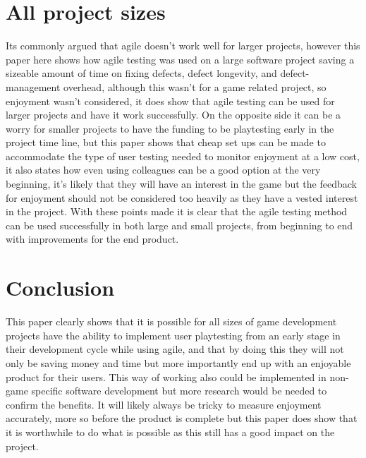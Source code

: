 \documentclass{scrartcl}
\begin{document}
\section{All project sizes}
Its commonly argued that agile doesn't work well for larger projects, however this paper here\cite{talby2006agile} shows how agile testing was used on a large software project saving a sizeable amount of time on fixing defects, defect longevity, and defect-management overhead, although this wasn't for a game related project, so enjoyment wasn't considered, it does show that agile testing can be used for larger projects and have it work successfully. On the opposite side it can be a worry for smaller projects to have the funding to be playtesting early in the project time line, but this paper\cite{moosajee2016games} shows that cheap set ups can be made to accommodate the type of user testing needed to monitor enjoyment at a low cost, it also states how even using colleagues can be a good option at the very beginning, it's likely that they will have an interest in the game but the feedback for enjoyment should not be considered too heavily as they have a vested interest in the project. With these points made it is clear that the agile testing method can be used successfully in both large and small projects, from beginning to end with improvements for the end product.


\section{Conclusion}

This paper clearly shows that it is possible for all sizes of game development projects have the ability to implement user playtesting from an early stage in their development cycle while using agile, and that by doing this they will not only be saving money and time but more importantly end up with an enjoyable product for their users. This way of working also could be implemented in non-game specific software development but more research would be needed to confirm the benefits. It will likely always be tricky to measure enjoyment accurately, more so before the product is complete but this paper does show that it is worthwhile to do what is possible as this still has a good impact on the project.




\end{document}
